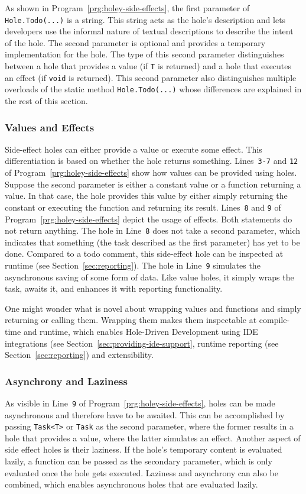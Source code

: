 As shown in Program~\ref{prg:holey-side-effects}, the first parameter of \verb|Hole.Todo(...)| is a string.
This string acts as the hole's description and lets developers use the informal nature of textual descriptions to describe the intent of the hole.
The second parameter is optional and provides a temporary implementation for the hole.
The type of this second parameter distinguishes between a hole that provides a value (if \verb|T| is returned) and a hole that executes an effect (if \verb|void| is returned).
This second parameter also distinguishes multiple overloads of the static method \verb|Hole.Todo(...)| whose differences are explained in the rest of this section.

\subsubsection{Values and Effects}
Side-effect holes can either provide a value or execute some effect.
This differentiation is based on whether the hole returns something.
Lines~\verb|3-7| and \verb|12| of Program~\ref{prg:holey-side-effects} show how values can be provided using holes.
Suppose the second parameter is either a constant value or a function returning a value.
In that case, the hole provides this value by either simply returning the constant or executing the function and returning its result.
Lines~\verb|8| and \verb|9| of Program~\ref{prg:holey-side-effects} depict the usage of effects.
Both statements do not return anything.
The hole in Line~\verb|8| does not take a second parameter, which indicates that something (the task described as the first parameter) has yet to be done.
Compared to a todo comment, this side-effect hole can be inspected at runtime (see Section~\ref{sec:reporting}).
The hole in Line~\verb|9| simulates the asynchronous saving of some form of data.
Like value holes, it simply wraps the task, awaits it, and enhances it with reporting functionality.

One might wonder what is novel about wrapping values and functions and simply returning or calling them.
Wrapping them makes them inspectable at compile-time and runtime, which enables Hole-Driven Development using IDE integrations (see Section~\ref{sec:providing-ide-support}, runtime reporting (see Section~\ref{sec:reporting}) and extensibility.

\subsubsection{Asynchrony and Laziness}
As visible in Line~\verb|9| of Program~\ref{prg:holey-side-effects}, holes can be made asynchronous and therefore have to be awaited.
This can be accomplished by passing \verb|Task<T>| or \verb|Task| as the second parameter, where the former results in a hole that provides a value, where the latter simulates an effect.
Another aspect of side effect holes is their laziness.
If the hole's temporary content is evaluated lazily, a function can be passed as the secondary parameter, which is only evaluated once the hole gets executed.
Laziness and asynchrony can also be combined, which enables asynchronous holes that are evaluated lazily.

